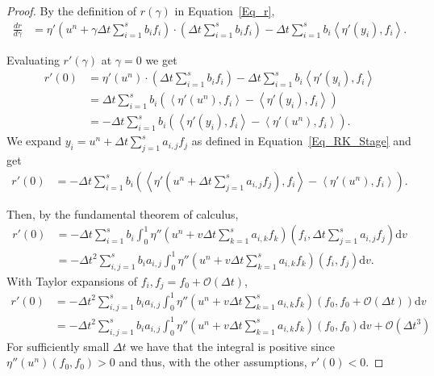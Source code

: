 \documentclass{article}
\newcommand{\inner}[2]{\left< #1 , #2 \right>}
\begin{document}
    \begin{proof}
        By the definition of \(r(\gamma)\) in Equation~\ref{Eq_r},
        \begin{align*}
            \frac{dr}{d\gamma}  &= \eta'(u^n + \gamma \Delta t \sum_{i=1}^{s}b_if_i) \cdot \left(\Delta t \sum_{i=1}^{s}b_if_i\right) - \Delta t \sum_{i=1}^{s}b_i\inner{\eta'(y_i)}{f_i}.
        \end{align*}

        Evaluating \(r'(\gamma)\) at \(\gamma = 0\) we get
        \begin{align*}
            r'(0)   &= \eta'(u^n) \cdot \left(\Delta t \sum_{i=1}^{s}b_if_i\right) - \Delta t \sum_{i=1}^{s}b_i\inner{\eta'(y_i)}{f_i}\\
                    &= \Delta t \sum_{i=1}^{s}b_i \left( \inner{\eta'(u^n)}{f_i} - \inner{\eta'(y_i)}{f_i}\right) \\
                    &= -\Delta t \sum_{i=1}^{s}b_i \left( \inner{\eta'(y_i)}{f_i} - \inner{\eta'(u^n)}{f_i}\right).
        \end{align*}
        We expand \(y_i = u^n + \Delta t \sum_{j=1}^{s}a_{i,j}f_j\) as defined in Equation~\ref{Eq_RK_Stage} and get
        \begin{align*}
            r'(0) &= -\Delta t \sum_{i=1}^{s}b_i \left( \inner{\eta'\left(u^n + \Delta t \sum_{j=1}^{s}a_{i,j}f_j\right)}{f_i} - \inner{\eta'(u^n)}{f_i}\right).
        \end{align*}


        Then, by the fundamental theorem of calculus,
        \begin{align*}
            r'(0)   &= -\Delta t \sum_{i=1}^{s}b_i \int_{0}^{1}\eta''\left(u^n + v\Delta t \sum_{k=1}^{s}a_{i,k}f_k\right)\left(f_i,\Delta t \sum_{j=1}^{s}a_{i,j}f_j\right)\text{d}v \\
                    &= -\Delta t^2 \sum_{i,j=1}^{s}b_ia_{i,j} \int_{0}^{1}\eta''\left(u^n + v\Delta t \sum_{k=1}^{s}a_{i,k}f_k\right)\left(f_i,f_j\right)\text{d}v.
        \end{align*}
        With Taylor expansions of \(f_i, f_j = f_0 + \mathcal{O}(\Delta t)\),
        \begin{align*}
            r'(0)   &= -\Delta t^2 \sum_{i,j=1}^{s}b_ia_{i,j} \int_{0}^{1}\eta''\left(u^n + v\Delta t \sum_{k=1}^{s}a_{i,k}f_k\right)\left(f_0,f_0 + \mathcal{O}(\Delta t)\right)\text{d}v\\
                    &= -\Delta t^2 \sum_{i,j=1}^{s}b_ia_{i,j} \int_{0}^{1}\eta''\left(u^n + v\Delta t \sum_{k=1}^{s}a_{i,k}f_k\right)\left(f_0,f_0 \right)\text{d}v + \mathcal{O}(\Delta t^3)
        \end{align*}
        For sufficiently small \(\Delta t\) we have that the integral is positive since \(\eta''(u^n)(f_0,f_0) > 0\) and thus, with the other assumptions, \(r'(0)<0\).
    \end{proof}
\end{document}
